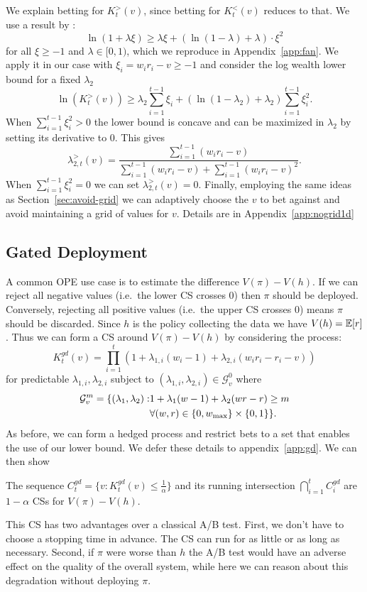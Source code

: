 We explain betting for $K_t^{>}(v)$, since betting for $K_t^{<}(v)$ reduces to
that.  We use a result by \citet{fan2015exponential}:
\[
\ln(1+\lambda \xi) \geq \lambda \xi+\left(\ln\left(1-\lambda\right)+\lambda\right)\cdot \xi^{2}
\]
for all $\xi\geq -1$ and $\lambda \in [0,1)$, which we reproduce in
Appendix~\ref{app:fan}.  We apply it in our case with $\xi_i=w_ir_i-v\geq -1$
and consider the log wealth lower bound for a fixed $\lambda_2$
\[
\ln(K_t^{>}(v)) \geq \lambda_2 \sum_{i=1}^{t-1} \xi_i + \left(\ln\left(1-\lambda_2\right)+\lambda_2\right) \sum_{i=1}^{t-1} \xi_i^2.
\]
When $\sum_{i=1}^{t-1} \xi_i^2>0$ the lower bound is concave and can 
be maximized in $\lambda_2$ by setting its derivative to 0. This gives
\[
\lambda_{2,t}^{>}(v) = \frac{\sum_{i=1}^{t-1} (w_i r_i -v)}{\sum_{i=1}^{t-1} (w_i r_i -v)+\sum_{i=1}^{t-1} (w_i r_i -v)^2}.
\]
When $\sum_{i=1}^{t-1} \xi_i^2=0$ we can set $\lambda_{2,t}^{>}(v)=0$.
Finally, employing the same ideas as Section~\ref{sec:avoid-grid} we can
adaptively choose the $v$ to bet against and avoid maintaining a grid of values
for $v$. Details are in Appendix~\ref{app:nogrid1d}



\subsection{Gated Deployment}
A common OPE use case is to estimate the difference $V(\pi) - V(h)$. If we
can reject all negative values (i.e.\ the lower CS crosses 0) then $\pi$ should be deployed. Conversely,
rejecting all positive values (i.e.\ the upper CS crosses 0) means $\pi$ should be discarded. Since $h$ is the policy collecting the data we have $V(h)=\mathbb{E}[r]$. Thus we can form a CS 
around $V(\pi) - V(h)$ by considering the process:
\[
K_t^{gd}(v) = \prod_{i=1}^t \left(1+\lambda_{1,i} (w_i-1) + \lambda_{2,i}(w_ir_i -r_i -v)\right)  
\]
for predictable $\lambda_{1,i},\lambda_{2,i}$ subject to $(\lambda_{1,i},\lambda_{2,i}) \in \mathcal{G}_{v}^0$
where
\begin{align}
\mathcal{G}_{v}^m = \{(\lambda_{1},\lambda_{2}): & 1+\lambda_1(w-1)+\lambda_2(wr-r)\geq m \notag\\
                         & \forall (w,r) \in \{0,w_{\max}\}\times \{0,1\}
\}.
\end{align}
As before, we can form a hedged process and restrict bets to a set that
enables the use of our lower bound. We defer these details to 
appendix~\ref{app:gd}. We can then show
\begin{theorem}
\label{thm:gated}
The sequence $C_t^{gd} = \{v:K_t^{gd}(v)\leq \frac{1}{\alpha}\}$ and its 
running intersection $\bigcap_{i=1}^t C_i^{gd}$
are $1-\alpha$ CSs for $V(\pi)-V(h)$.
\end{theorem}
This CS has two advantages 
over a classical A/B test. First, we don't have to 
choose a stopping time in advance. The CS can run for
as little or as long as necessary. Second, if $\pi$ were
worse than $h$ the A/B test would have an adverse effect
on the quality of the overall system, while here we can
reason about this degradation without deploying $\pi$.

